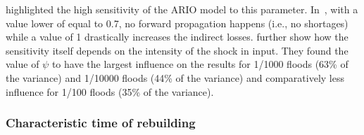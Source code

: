 \documentclass[main.tex]{subfiles}
\begin{document}

\Textcite{koks-2014-integ-direc, hallegatte-2013-model-role} highlighted the high sensitivity of the ARIO model to this
parameter. In~\textcite{hallegatte-2013-model-role}, with a value
lower of equal to 0.7, no forward propagation happens (i.e., no shortages) while
a value of 1 drastically increases the indirect losses.
\Textcite{koks-2014-integ-direc} further show how the
sensitivity itself depends on the intensity of the shock in input. They found
the value of $\psi$ to have the largest influence on the results
for 1/1000 floods (63\% of the variance) and 1/10000 floods (44\% of the
variance) and comparatively less influence for 1/100 floods (35\% of the
variance).

\subsubsection{Characteristic time of rebuilding}
\label{sec:recovery-param}
\end{document}
